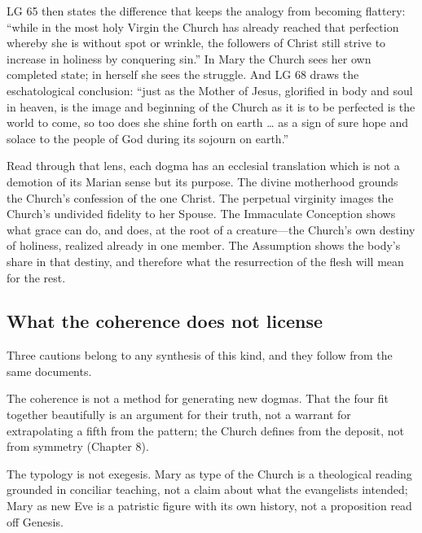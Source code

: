 LG 65 then states the difference that keeps the analogy from becoming
flattery: ``while in the most holy Virgin the Church has already reached
that perfection whereby she is without spot or wrinkle, the followers of
Christ still strive to increase in holiness by conquering sin.'' In Mary
the Church sees her own completed state; in herself she sees the
struggle. And LG 68 draws the eschatological conclusion: ``just as the
Mother of Jesus, glorified in body and soul in heaven, is the image and
beginning of the Church as it is to be perfected is the world to come, so
too does she shine forth on earth \ldots{} as a sign of sure hope and
solace to the people of God during its sojourn on earth.''

Read through that lens, each dogma has an ecclesial translation which is
not a demotion of its Marian sense but its purpose. The divine motherhood
grounds the Church's confession of the one Christ. The perpetual
virginity images the Church's undivided fidelity to her Spouse. The
Immaculate Conception shows what grace can do, and does, at the root of a
creature---the Church's own destiny of holiness, realized already in one
member. The Assumption shows the body's share in that destiny, and
therefore what the resurrection of the flesh will mean for the rest.

\subsection*{What the coherence does not license}

Three cautions belong to any synthesis of this kind, and they follow from
the same documents.

The coherence is not a method for generating new dogmas. That the four
fit together beautifully is an argument for their truth, not a warrant
for extrapolating a fifth from the pattern; the Church defines from the
deposit, not from symmetry (Chapter 8).

The typology is not exegesis. Mary as type of the Church is a
theological reading grounded in conciliar teaching, not a claim about
what the evangelists intended; Mary as new Eve is a patristic figure with
its own history, not a proposition read off Genesis.

